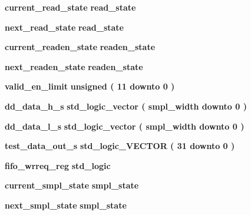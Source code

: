 \begin{DoxyCompactItemize}
\item 
{\bf current\+\_\+read\+\_\+state} {\bfseries {\bfseries {\bf read\+\_\+state}} \textcolor{vhdlchar}{ }} 
\item 
{\bf next\+\_\+read\+\_\+state} {\bfseries {\bfseries {\bf read\+\_\+state}} \textcolor{vhdlchar}{ }} 
\item 
{\bf current\+\_\+readen\+\_\+state} {\bfseries {\bfseries {\bf readen\+\_\+state}} \textcolor{vhdlchar}{ }} 
\item 
{\bf next\+\_\+readen\+\_\+state} {\bfseries {\bfseries {\bf readen\+\_\+state}} \textcolor{vhdlchar}{ }} 
\item 
{\bf valid\+\_\+en\+\_\+limit} {\bfseries \textcolor{comment}{unsigned}\textcolor{vhdlchar}{ }\textcolor{vhdlchar}{(}\textcolor{vhdlchar}{ }\textcolor{vhdlchar}{ } \textcolor{vhdldigit}{11} \textcolor{vhdlchar}{ }\textcolor{keywordflow}{downto}\textcolor{vhdlchar}{ }\textcolor{vhdlchar}{ } \textcolor{vhdldigit}{0} \textcolor{vhdlchar}{ }\textcolor{vhdlchar}{)}\textcolor{vhdlchar}{ }} 
\item 
{\bf dd\+\_\+data\+\_\+h\+\_\+s} {\bfseries \textcolor{comment}{std\+\_\+logic\+\_\+vector}\textcolor{vhdlchar}{ }\textcolor{vhdlchar}{(}\textcolor{vhdlchar}{ }\textcolor{vhdlchar}{ }\textcolor{vhdlchar}{ }\textcolor{vhdlchar}{ }{\bfseries {\bf smpl\+\_\+width}} \textcolor{vhdlchar}{ }\textcolor{keywordflow}{downto}\textcolor{vhdlchar}{ }\textcolor{vhdlchar}{ } \textcolor{vhdldigit}{0} \textcolor{vhdlchar}{ }\textcolor{vhdlchar}{)}\textcolor{vhdlchar}{ }} 
\item 
{\bf dd\+\_\+data\+\_\+l\+\_\+s} {\bfseries \textcolor{comment}{std\+\_\+logic\+\_\+vector}\textcolor{vhdlchar}{ }\textcolor{vhdlchar}{(}\textcolor{vhdlchar}{ }\textcolor{vhdlchar}{ }\textcolor{vhdlchar}{ }\textcolor{vhdlchar}{ }{\bfseries {\bf smpl\+\_\+width}} \textcolor{vhdlchar}{ }\textcolor{keywordflow}{downto}\textcolor{vhdlchar}{ }\textcolor{vhdlchar}{ } \textcolor{vhdldigit}{0} \textcolor{vhdlchar}{ }\textcolor{vhdlchar}{)}\textcolor{vhdlchar}{ }} 
\item 
{\bf test\+\_\+data\+\_\+out\+\_\+s} {\bfseries \textcolor{comment}{std\+\_\+logic\+\_\+\+V\+E\+C\+T\+OR}\textcolor{vhdlchar}{ }\textcolor{vhdlchar}{(}\textcolor{vhdlchar}{ }\textcolor{vhdlchar}{ } \textcolor{vhdldigit}{31} \textcolor{vhdlchar}{ }\textcolor{keywordflow}{downto}\textcolor{vhdlchar}{ }\textcolor{vhdlchar}{ } \textcolor{vhdldigit}{0} \textcolor{vhdlchar}{ }\textcolor{vhdlchar}{)}\textcolor{vhdlchar}{ }} 
\item 
{\bf fifo\+\_\+wrreq\+\_\+reg} {\bfseries \textcolor{comment}{std\+\_\+logic}\textcolor{vhdlchar}{ }} 
\item 
{\bf current\+\_\+smpl\+\_\+state} {\bfseries {\bfseries {\bf smpl\+\_\+state}} \textcolor{vhdlchar}{ }} 
\item 
{\bf next\+\_\+smpl\+\_\+state} {\bfseries {\bfseries {\bf smpl\+\_\+state}} \textcolor{vhdlchar}{ }} 
\end{DoxyCompactItemize}
